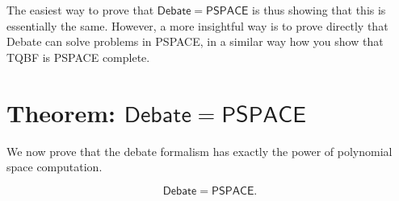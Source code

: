 \documentclass[11pt]{article}
\begin{document}
The easiest way to prove that $\mathsf{Debate} = \mathsf{PSPACE}$ is thus showing that this is essentially the same. However, a more insightful way is to prove directly that Debate can solve problems in PSPACE, in a similar way how you show that TQBF is PSPACE complete.


\section{Theorem: \(\mathsf{Debate} = \mathsf{PSPACE}\)}

We now prove that the debate formalism has exactly the power of polynomial space computation.

\begin{theorem}
\[
\mathsf{Debate} = \mathsf{PSPACE}.
\]
\end{theorem}
\end{document}
